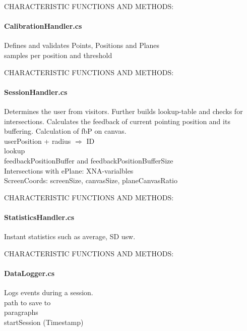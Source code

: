 CHARACTERISTIC FUNCTIONS AND METHODS: 


\paragraph{CalibrationHandler.cs} Defines and validates Points, Positions and Planes
\\
samples per position and threshold

CHARACTERISTIC FUNCTIONS AND METHODS: 


\paragraph{SessionHandler.cs} Determines the user from visitors. Further builds lookup-table and checks for intersections. Calculates the feedback of current pointing position and its buffering. Calculation of fbP on canvas.
\\
userPosition + radius $\Rightarrow$ ID
\\
lookup
\\
feedbackPositionBuffer and feedbackPositionBufferSize
\\
Intersections with ePlane: XNA-varialbles
\\
ScreenCoords: screenSize, canvasSize, planeCanvasRatio

CHARACTERISTIC FUNCTIONS AND METHODS: 


\paragraph{StatisticsHandler.cs} Instant statistics such as average, SD usw. 

CHARACTERISTIC FUNCTIONS AND METHODS: 


\paragraph{DataLogger.cs} Logs events during a session.
\\
path to save to
\\
paragraphs
\\
startSession (Timestamp)

